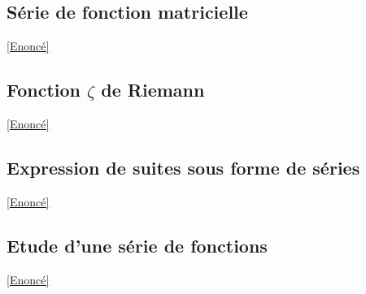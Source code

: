 \documentclass{book}
\begin{document}
	\subsection{Série de fonction matricielle}
	\label{sec:serie-de-fonction-matricielle}
	\textcolor{blue}{\hyperref[Série de fonction matricielle]{[Enoncé]}}\\
	
	\subsection{Fonction $\zeta$ de Riemann}
	\label{sec:fonction-zeta-de-riemann}
	\textcolor{blue}{\hyperref[Fonction zeta de Riemann]{[Enoncé]}}\\
	
	\subsection{Expression de suites sous forme de séries}
	\label{sec:expression-de-suites-sous-forme-de-series}
	\textcolor{blue}{\hyperref[Expression de suites sous forme de séries]{[Enoncé]}}\\
	
	\subsection{Etude d'une série de fonctions}
	\label{sec:etude-dune-serie-de-fonctions}
	\textcolor{blue}{\hyperref[Etude d'une série de fonctions]{[Enoncé]}}\\
	
\end{document}
